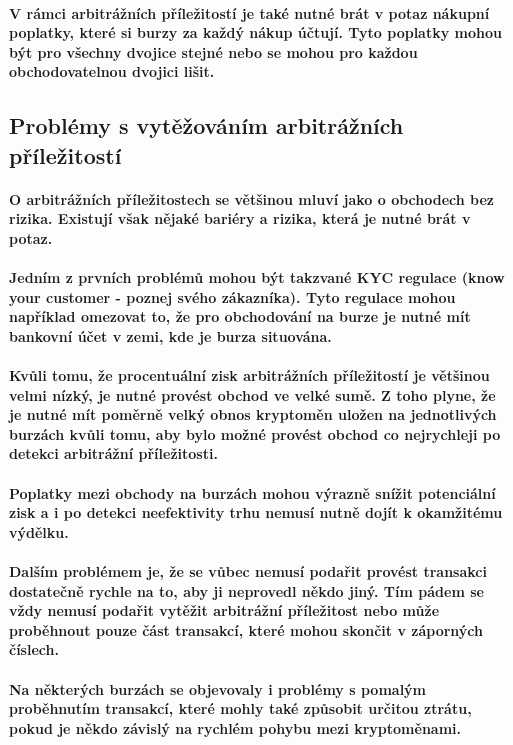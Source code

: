 \documentclass[thesis=B,czech]{FITthesis}[2019/03/21]
\begin{document}
\paragraph{
V rámci arbitrážních příležitostí je také nutné brát v potaz nákupní poplatky, které si burzy za každý nákup účtují. Tyto poplatky mohou být pro všechny dvojice stejné nebo se mohou pro každou obchodovatelnou dvojici lišit.  
}
\subsection{Problémy s vytěžováním arbitrážních příležitostí}
\paragraph{
O arbitrážních příležitostech se většinou mluví jako o obchodech bez rizika. Existují však nějaké bariéry a rizika, která je nutné brát v potaz.
}
\paragraph{
Jedním z prvních problémů mohou být takzvané KYC regulace (know your customer - poznej svého zákazníka). Tyto regulace mohou například omezovat to, že pro obchodování na burze je nutné mít bankovní účet v zemi, kde je burza situována.
}
\paragraph{
Kvůli tomu, že procentuální zisk arbitrážních příležitostí je většinou velmi nízký, je nutné provést obchod ve velké sumě. Z toho plyne, že je nutné mít poměrně velký obnos kryptoměn uložen na jednotlivých burzách kvůli tomu, aby bylo možné provést obchod co nejrychleji po detekci arbitrážní příležitosti. 
}
\paragraph{
Poplatky mezi obchody na burzách mohou výrazně snížit potenciální zisk a i po detekci neefektivity trhu nemusí nutně dojít k okamžitému výdělku.  
}
\paragraph{
Dalším problémem je, že se vůbec nemusí podařit provést transakci dostatečně rychle na to, aby ji neprovedl někdo jiný. Tím pádem se vždy nemusí podařit vytěžit arbitrážní příležitost nebo může proběhnout pouze část transakcí, které mohou skončit v záporných číslech.
}
\paragraph{
Na některých burzách se objevovaly i problémy s pomalým proběhnutím transakcí, které mohly také způsobit určitou ztrátu, pokud je někdo závislý na rychlém pohybu mezi kryptoměnami. \cite{finder}
}
\end{document}

